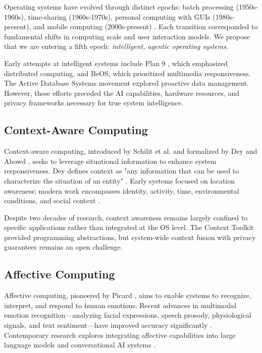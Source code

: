 \documentclass[conference]{IEEEtran}
\begin{document}
Operating systems have evolved through distinct epochs: batch processing (1950s-1960s), time-sharing (1960s-1970s), personal computing with GUIs (1980s-present), and mobile computing (2000s-present) \cite{tanenbaum2014modern}. Each transition corresponded to fundamental shifts in computing scale and user interaction models. We propose that we are entering a fifth epoch: \textit{intelligent, agentic operating systems}.

Early attempts at intelligent systems include Plan 9 \cite{pike1995plan9}, which emphasized distributed computing, and BeOS, which prioritized multimedia responsiveness. The Active Database Systems movement \cite{widom1996active} explored proactive data management. However, these efforts preceded the AI capabilities, hardware resources, and privacy frameworks necessary for true system intelligence.

\subsection{Context-Aware Computing}

Context-aware computing, introduced by Schilit et al. \cite{schilit1994context} and formalized by Dey and Abowd \cite{abowd1999understanding, dey2001understanding}, seeks to leverage situational information to enhance system responsiveness. Dey defines context as "any information that can be used to characterize the situation of an entity" \cite{dey2001understanding}. Early systems focused on location awareness; modern work encompasses identity, activity, time, environmental conditions, and social context \cite{perera2014survey}.

Despite two decades of research, context awareness remains largely confined to specific applications rather than integrated at the OS level. The Context Toolkit \cite{dey2001conceptual} provided programming abstractions, but system-wide context fusion with privacy guarantees remains an open challenge.

\subsection{Affective Computing}

Affective computing, pioneered by Picard \cite{picard1997affective}, aims to enable systems to recognize, interpret, and respond to human emotions. Recent advances in multimodal emotion recognition—analyzing facial expressions, speech prosody, physiological signals, and text sentiment—have improved accuracy significantly \cite{poria2017review}. Contemporary research explores integrating affective capabilities into large language models and conversational AI systems \cite{liu2024affective}.
\end{document}
